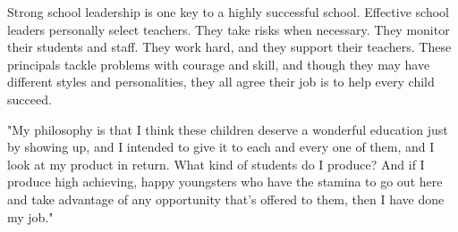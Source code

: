 Strong school leadership is one key to a highly successful school. Effective school leaders personally select teachers. They take risks when necessary. They monitor their students and staff. They work hard, and they support their teachers. These principals tackle problems with courage and skill, and though they may have different styles and personalities, they all agree their job is to help every child succeed.

"My philosophy is that I think these children deserve a wonderful education just by showing up, and I intended to give it to each and every one of them, and I look at my product in return. What kind of students do I produce? And if I produce high achieving, happy youngsters who have the stamina to go out here and take advantage of any opportunity that's offered to them, then I have done my job."